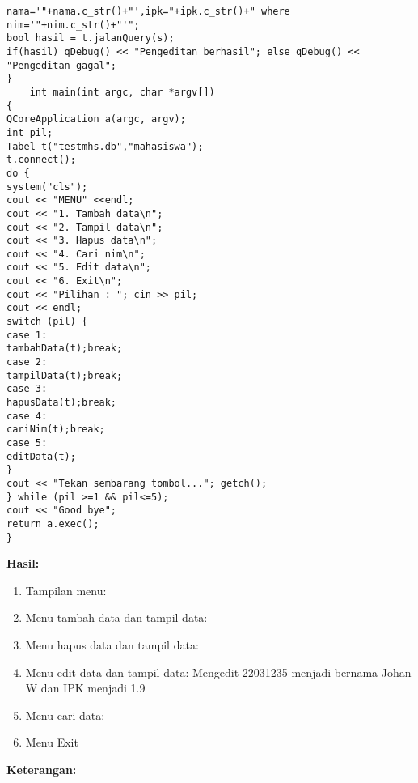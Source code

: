 \begin{enumerate}
\begin{verbatim}
nama='"+nama.c_str()+"',ipk="+ipk.c_str()+" where nim='"+nim.c_str()+"'";
bool hasil = t.jalanQuery(s);
if(hasil) qDebug() << "Pengeditan berhasil"; else qDebug() << "Pengeditan gagal";
}
    int main(int argc, char *argv[])
{
QCoreApplication a(argc, argv);
int pil;
Tabel t("testmhs.db","mahasiswa");
t.connect();
do {
system("cls");
cout << "MENU" <<endl;
cout << "1. Tambah data\n";
cout << "2. Tampil data\n";
cout << "3. Hapus data\n";
cout << "4. Cari nim\n";
cout << "5. Edit data\n";
cout << "6. Exit\n";
cout << "Pilihan : "; cin >> pil;
cout << endl;
switch (pil) {
case 1:
tambahData(t);break;
case 2:
tampilData(t);break;
case 3:
hapusData(t);break;
case 4:
cariNim(t);break;
case 5:
editData(t);
}
cout << "Tekan sembarang tombol..."; getch();
} while (pil >=1 && pil<=5);
cout << "Good bye";
return a.exec();
}
\end{verbatim}
\end{enumerate}

\textbf{Hasil:}

\begin{enumerate}
\def\labelenumi{\arabic{enumi}.}
\item
  Tampilan menu:
\item
  Menu tambah data dan tampil data:
\item
  Menu hapus data dan tampil data:
\item
  Menu edit data dan tampil data: Mengedit 22031235 menjadi bernama
  Johan W dan IPK menjadi 1.9
\item
  Menu cari data:
\item
  Menu Exit
\end{enumerate}

\textbf{Keterangan:}

